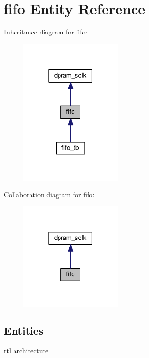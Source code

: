 \hypertarget{classfifo}{}\section{fifo Entity Reference}
\label{classfifo}


Inheritance diagram for fifo\+:\nopagebreak
\begin{figure}[H]
\begin{center}
\leavevmode
\includegraphics[width=147pt]{classfifo__inherit__graph}
\end{center}
\end{figure}


Collaboration diagram for fifo\+:\nopagebreak
\begin{figure}[H]
\begin{center}
\leavevmode
\includegraphics[width=147pt]{classfifo__coll__graph}
\end{center}
\end{figure}
\subsection*{Entities}
\begin{DoxyCompactItemize}
\item 
\hyperlink{classfifo_1_1rtl}{rtl} architecture
\end{DoxyCompactItemize}
